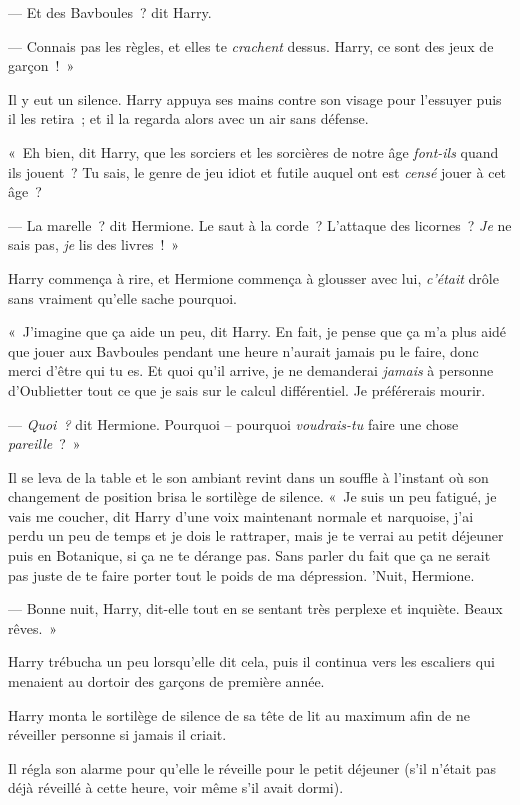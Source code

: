 --- Et des Bavboules~? dit Harry.

--- Connais pas les règles, et elles te \emph{crachent} dessus. Harry, ce sont des jeux de garçon~!~»

Il y eut un silence. Harry appuya ses mains contre son visage pour l'essuyer puis il les retira~; et il la regarda alors avec un air sans défense.

«~Eh bien, dit Harry, que les sorciers et les sorcières de notre âge \emph{font-ils} quand ils jouent~? Tu sais, le genre de jeu idiot et futile auquel ont est \emph{censé} jouer à cet âge~?

--- La marelle~? dit Hermione. Le saut à la corde~? L'attaque des licornes~? \emph{Je} ne sais pas, \emph{je} lis des livres~!~»

Harry commença à rire, et Hermione commença à glousser avec lui, \emph{c'était} drôle sans vraiment qu'elle sache pourquoi.

«~J'imagine que ça aide un peu, dit Harry. En fait, je pense que ça m'a plus aidé que jouer aux Bavboules pendant une heure n'aurait jamais pu le faire, donc merci d'être qui tu es. Et quoi qu'il arrive, je ne demanderai \emph{jamais} à personne d'Oublietter tout ce que je sais sur le calcul différentiel. Je préférerais mourir.

--- \emph{Quoi~?} dit Hermione. Pourquoi -- pourquoi \emph{voudrais-tu} faire une chose \emph{pareille}~?~»

Il se leva de la table et le son ambiant revint dans un souffle à l'instant où son changement de position brisa le sortilège de silence. «~Je suis un peu fatigué, je vais me coucher, dit Harry d'une voix maintenant normale et narquoise, j'ai perdu un peu de temps et je dois le rattraper, mais je te verrai au petit déjeuner puis en Botanique, si ça ne te dérange pas. Sans parler du fait que ça ne serait pas juste de te faire porter tout le poids de ma dépression. 'Nuit, Hermione.

--- Bonne nuit, Harry, dit-elle tout en se sentant très perplexe et inquiète. Beaux rêves.~»

Harry trébucha un peu lorsqu'elle dit cela, puis il continua vers les escaliers qui menaient au dortoir des garçons de première année.

\later

Harry monta le sortilège de silence de sa tête de lit au maximum afin de ne réveiller personne si jamais il criait.

Il régla son alarme pour qu'elle le réveille pour le petit déjeuner (s'il n'était pas déjà réveillé à cette heure, voir même s'il avait dormi).

